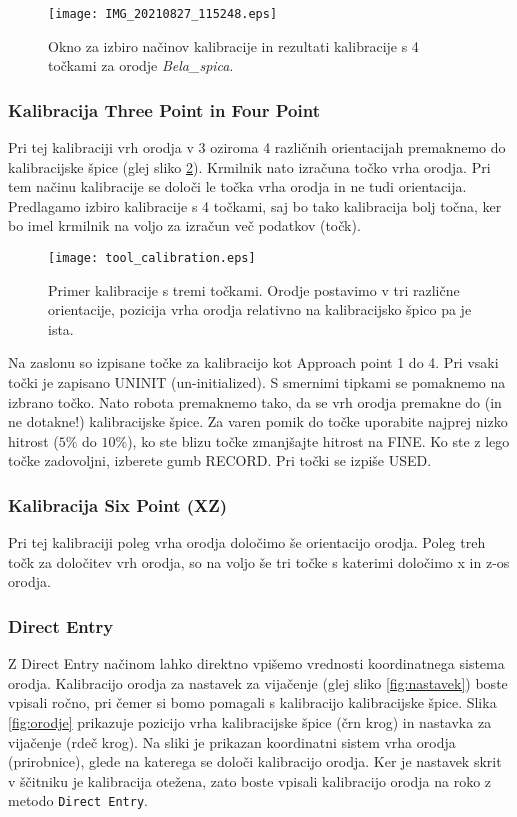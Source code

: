 \begin{figure}[!hbt]
	\centering
	\texttt{[image: IMG\_20210827\_115248.eps]}
	\caption{Okno za izbiro načinov kalibracije in rezultati kalibracije s 4 točkami za orodje {\em Bela\_spica}.}
	\label{fig:calib_seznam}
\end{figure}

\subsubsection{Kalibracija Three Point in Four Point}

Pri tej kalibraciji vrh orodja v 3 oziroma 4 različnih orientacijah premaknemo do kalibracijske špice (glej sliko \ref{fig:tool_3}). Krmilnik nato izračuna točko vrha orodja. Pri tem načinu kalibracije se določi le točka vrha orodja in ne tudi orientacija. Predlagamo izbiro kalibracije s 4 točkami, saj bo tako kalibracija bolj točna, ker bo imel krmilnik na voljo za izračun več podatkov (točk).

\begin{figure}[!hbt]
	\centering
	\texttt{[image: tool\_calibration.eps]}
	\caption{Primer kalibracije s tremi točkami. Orodje postavimo v tri različne orientacije, pozicija vrha orodja relativno na kalibracijsko špico pa je ista.}
	\label{fig:tool_3}
\end{figure}

Na zaslonu so izpisane točke za kalibracijo kot Approach point 1 do 4. Pri vsaki točki je zapisano UNINIT (un-initialized). S smernimi tipkami se pomaknemo na izbrano točko. Nato robota premaknemo tako, da se vrh orodja premakne do (in ne dotakne!) kalibracijske špice. Za varen pomik do točke uporabite najprej nizko hitrost ($5\%$ do $10\%$), ko ste blizu točke zmanjšajte hitrost na FINE. Ko ste z lego točke zadovoljni, izberete gumb RECORD. Pri točki se izpiše USED.

\subsubsection{	Kalibracija Six Point (XZ)}
Pri tej kalibraciji poleg vrha orodja določimo še orientacijo orodja. Poleg treh točk za določitev vrh orodja, so na voljo še tri točke s katerimi določimo x in z-os orodja.

\subsubsection{Direct Entry}
Z Direct Entry načinom lahko direktno vpišemo vrednosti koordinatnega sistema orodja. Kalibracijo orodja za nastavek za vijačenje (glej sliko \ref{fig:nastavek}) boste vpisali ročno, pri čemer si bomo pomagali s kalibracijo kalibracijske špice. Slika \ref{fig:orodje} prikazuje pozicijo vrha kalibracijske špice (črn krog) in nastavka za vijačenje (rdeč krog). Na sliki je prikazan koordinatni sistem vrha orodja (prirobnice), glede na katerega se določi kalibracijo orodja. Ker je nastavek skrit v ščitniku je kalibracija otežena, zato boste vpisali kalibracijo orodja na roko z metodo \verb|Direct Entry|.

